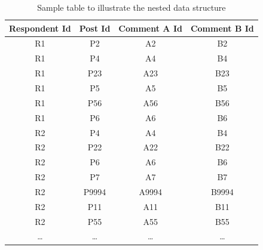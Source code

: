 \documentclass{article}
\begin{document}
\begin{table}[htbp]
    \centering
    \begin{tabular}{|c|c|c|c|}
    \hline
    \textbf{Respondent Id} & \textbf{Post Id} & \textbf{Comment A Id} & \textbf{Comment B Id} \\
    \hline
    R1 & P2 & A2 & B2 \\
    R1 & P4 & A4 & B4 \\
    R1 & P23 & A23 & B23 \\
    R1 & P5 & A5 & B5 \\
    R1 & P56 & A56 & B56 \\
    R1 & P6 & A6 & B6 \\
    \midrule
    R2 & P4 & A4 & B4 \\
    R2 & P22 & A22 & B22 \\
    R2 & P6 & A6 & B6 \\
    R2 & P7 & A7 & B7 \\
    R2 & P9994 & A9994 & B9994 \\
    R2 & P11 & A11 & B11 \\
    R2 & P55 & A55 & B55 \\
    \midrule
    \dots & \dots & \dots & \dots \\
    \hline
    \end{tabular}
    \caption{Sample table to illustrate the nested data structure}
    \label{sample-table}
\end{table}

\clearpage

\end{document}
